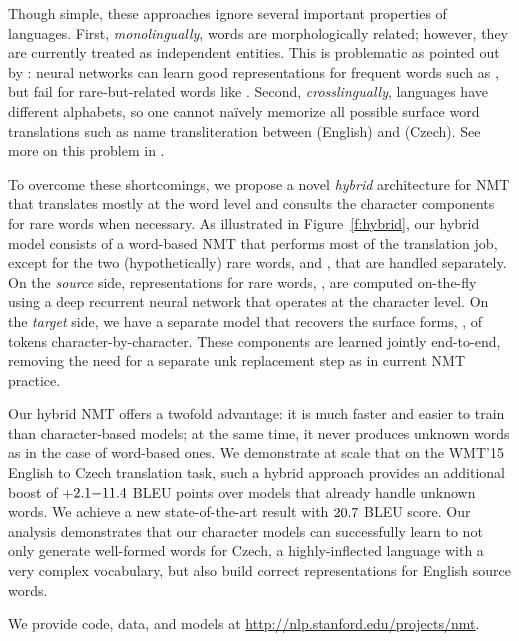 Though simple, these approaches ignore several important
properties of languages. First, {\it monolingually}, words are morphologically
related; however, they are currently treated as independent entities. This is
problematic as pointed out by
: neural networks can learn good
representations for frequent words such as , but fail for
rare-but-related words like . Second, {\it crosslingually},
languages have different alphabets, so one cannot na\"{i}vely memorize all
possible surface word translations such as name transliteration between 
 (English) and  (Czech). See more on this problem
in \cite{sennrich16sub}.

To overcome these shortcomings, we propose a novel {\it hybrid} architecture for NMT
that translates mostly at the word level and consults the character
components for rare words when necessary. As illustrated in
Figure~\ref{f:hybrid}, our hybrid model consists of a word-based NMT that
performs most of the translation job, except for the two (hypothetically) rare words,
 and , that are handled separately. On the {\it source}
side, representations for rare words, , are
computed on-the-fly using a deep recurrent neural network that operates at the
character level. On the {\it target} side, we have a separate model that
recovers the surface forms, , of \unk{} tokens character-by-character.
These components are learned jointly end-to-end, removing the need for a separate
unk replacement step as in current NMT practice.

Our hybrid NMT offers a twofold advantage: it is much faster and easier to
train than character-based models; at the same time, it never produces unknown
words as in the case of word-based ones.
We demonstrate at scale that on the WMT'15 English to
Czech translation task, such a hybrid approach provides
an additional boost of +$2.1{-}11.4{}$ BLEU points over models 
that already handle unknown words.
We achieve a new state-of-the-art result with
$20.7{}$ BLEU score.
Our analysis demonstrates that our character models can successfully learn to not
only generate well-formed words for Czech, a
highly-inflected language with a very complex vocabulary, but also build correct
representations for English source words.

We provide code, data, and models at \url{http://nlp.stanford.edu/projects/nmt}.

